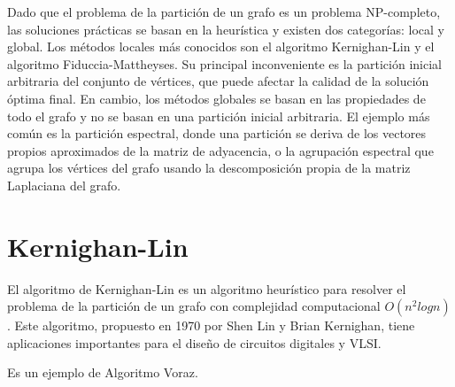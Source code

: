 Dado que el problema de la partición de un grafo es un problema NP-completo, las soluciones prácticas se basan en la heurística y existen dos categorías: local y global. Los métodos locales más conocidos son el algoritmo Kernighan-Lin\cite{KernighanLin} y el algoritmo Fiduccia-Mattheyses\cite{FiducciaMattheyses}. Su principal inconveniente es la partición inicial arbitraria del conjunto de vértices, que puede afectar la calidad de la solución óptima final. En cambio, los métodos globales se basan en las propiedades de todo el grafo y no se basan en una partición inicial arbitraria. El ejemplo más común es la partición espectral, donde una partición se deriva de los vectores propios aproximados de la matriz de adyacencia, o la agrupación espectral que agrupa los vértices del grafo usando la descomposición propia de la matriz Laplaciana del grafo.

\section{Kernighan-Lin}
El algoritmo de Kernighan-Lin\cite{KernighanLin} es un algoritmo heurístico para resolver el problema de la partición de un grafo con complejidad computacional $O({n}^2logn)$. Este algoritmo, propuesto en 1970 por Shen Lin y Brian Kernighan, tiene aplicaciones importantes para el diseño de circuitos digitales y VLSI. 

Es un ejemplo de Algoritmo Voraz.